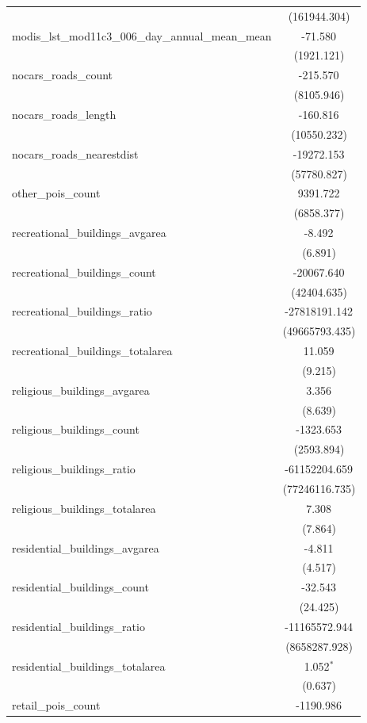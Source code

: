 \begin{table}[!htbp]
\begin{tabular}{@{\extracolsep{5pt}}lc}
  & (161944.304) \\
 modis_lst_mod11c3_006_day_annual_mean_mean & -71.580$^{}$ \\
  & (1921.121) \\
 nocars_roads_count & -215.570$^{}$ \\
  & (8105.946) \\
 nocars_roads_length & -160.816$^{}$ \\
  & (10550.232) \\
 nocars_roads_nearestdist & -19272.153$^{}$ \\
  & (57780.827) \\
 other_pois_count & 9391.722$^{}$ \\
  & (6858.377) \\
 recreational_buildings_avgarea & -8.492$^{}$ \\
  & (6.891) \\
 recreational_buildings_count & -20067.640$^{}$ \\
  & (42404.635) \\
 recreational_buildings_ratio & -27818191.142$^{}$ \\
  & (49665793.435) \\
 recreational_buildings_totalarea & 11.059$^{}$ \\
  & (9.215) \\
 religious_buildings_avgarea & 3.356$^{}$ \\
  & (8.639) \\
 religious_buildings_count & -1323.653$^{}$ \\
  & (2593.894) \\
 religious_buildings_ratio & -61152204.659$^{}$ \\
  & (77246116.735) \\
 religious_buildings_totalarea & 7.308$^{}$ \\
  & (7.864) \\
 residential_buildings_avgarea & -4.811$^{}$ \\
  & (4.517) \\
 residential_buildings_count & -32.543$^{}$ \\
  & (24.425) \\
 residential_buildings_ratio & -11165572.944$^{}$ \\
  & (8658287.928) \\
 residential_buildings_totalarea & 1.052$^{*}$ \\
  & (0.637) \\
 retail_pois_count & -1190.986$^{}$ \\

\end{tabular}
\end{table}
